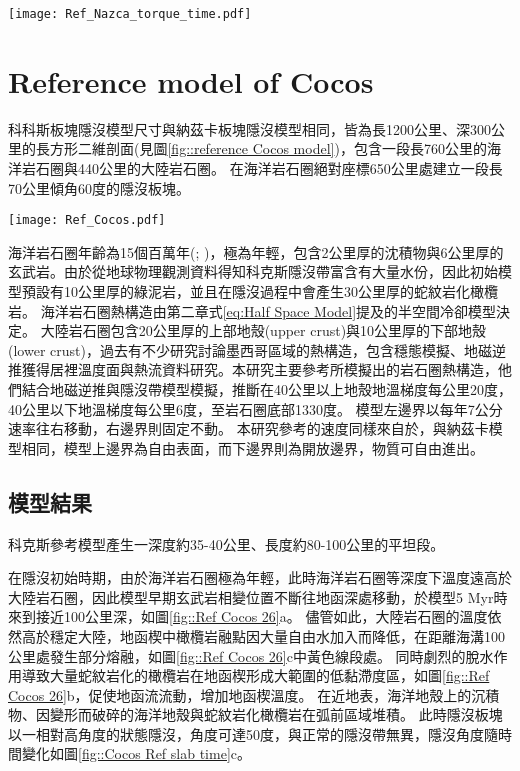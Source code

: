 \begin{figure*}[hb]
    \centering
    \texttt{[image: Ref\_Nazca\_torque\_time.pdf]}
    \caption[納茲卡參考模型重力力矩與動水壓力力矩隨時間變化]{納茲卡參考模型重力力矩與動水壓力力矩隨時間變化。}
    \label{fig::Nazca_Ref_torque_time}
\end{figure*}


\newpage
\section{Reference model of Cocos}

科科斯板塊隱沒模型尺寸與納茲卡板塊隱沒模型相同，皆為長1200公里、深300公里的長方形二維剖面(見圖\ref{fig::reference Cocos model})，包含一段長760公里的海洋岩石圈與440公里的大陸岩石圈。
在海洋岩石圈絕對座標650公里處建立一段長70公里傾角60度的隱沒板塊。
\begin{figure*}[ht!]
    \centering
    \texttt{[image: Ref\_Cocos.pdf]}
    \caption[科科斯板塊隱沒模型設計與邊界條件示意圖]{科科斯板塊隱沒模型設計與邊界條件示意圖}
    \label{fig::reference Cocos model}
\end{figure*}

海洋岩石圈年齡為15個百萬年(\citealp{Manea2011Thermal}; \citealp{muller2019})，極為年輕，包含2公里厚的沈積物與6公里厚的玄武岩。由於從地球物理觀測資料得知科克斯隱沒帶富含有大量水份，因此初始模型預設有10公里厚的綠泥岩，並且在隱沒過程中會產生30公里厚的蛇紋岩化橄欖岩。
海洋岩石圈熱構造由第二章式\ref{eq:Half Space Model}提及的半空間冷卻模型決定。
大陸岩石圈包含20公里厚的上部地殼(upper crust)與10公里厚的下部地殼(lower crust)，過去有不少研究討論墨西哥區域的熱構造，包含穩態模擬、地磁逆推獲得居裡溫度面與熱流資料研究。本研究主要參考\citealp{Manea2011Curie}所模擬出的岩石圈熱構造，他們結合地磁逆推與隱沒帶模型模擬，推斷在40公里以上地殼地溫梯度每公里20度，40公里以下地溫梯度每公里6度，至岩石圈底部1330度。
模型左邊界以每年7公分速率往右移動，右邊界則固定不動。
本研究參考的速度同樣來自於\citealp{o2005uncertainties}，與納茲卡模型相同，模型上邊界為自由表面，而下邊界則為開放邊界，物質可自由進出。


\subsection{模型結果}
科克斯參考模型產生一深度約35-40公里、長度約80-100公里的平坦段。

在隱沒初始時期，由於海洋岩石圈極為年輕，此時海洋岩石圈等深度下溫度遠高於大陸岩石圈，因此模型早期玄武岩相變位置不斷往地函深處移動，於模型5 Myr時來到接近100公里深，如圖\ref{fig::Ref Cocos 26}a。
儘管如此，大陸岩石圈的溫度依然高於穩定大陸，地函楔中橄欖岩融點因大量自由水加入而降低，在距離海溝100公里處發生部分熔融，如圖\ref{fig::Ref Cocos 26}c中黃色線段處。
同時劇烈的脫水作用導致大量蛇紋岩化的橄欖岩在地函楔形成大範圍的低黏滯度區，如圖\ref{fig::Ref Cocos 26}b，促使地函流流動，增加地函楔溫度。
在近地表，海洋地殼上的沉積物、因變形而破碎的海洋地殼與蛇紋岩化橄欖岩在弧前區域堆積。
此時隱沒板塊以一相對高角度的狀態隱沒，角度可達50度，與正常的隱沒帶無異，隱沒角度隨時間變化如圖\ref{fig::Cocos Ref slab time}c。

